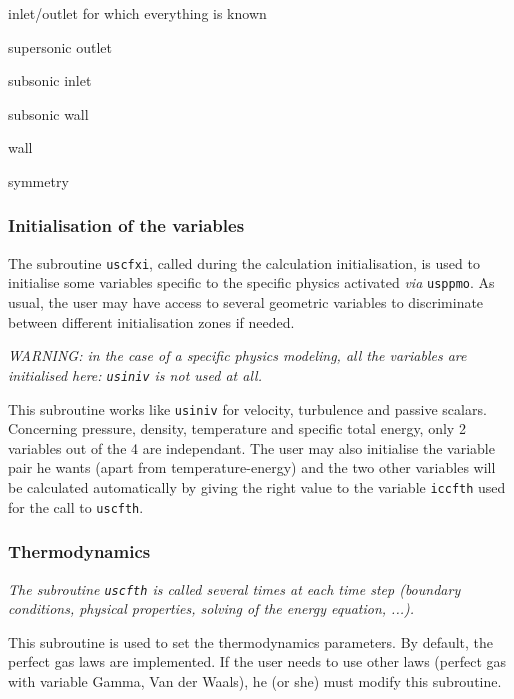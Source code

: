 {{{\begin{list}{-}{}
  \item inlet/outlet for which everything is known
  \item supersonic outlet
  \item subsonic inlet
  \item subsonic wall
  \item wall
  \item symmetry
\end{list}

\subsubsection{Initialisation of the variables}

The subroutine \texttt{uscfxi}, called during the calculation initialisation,
 is used to initialise some variables specific to the
specific physics activated {\em via} \texttt{usppmo}.  As usual,
the user may have access to several geometric variables to discriminate
between different initialisation zones if needed.

{\em WARNING: in the case of a specific physics modeling, all the
variables are initialised here: {\em \texttt{usiniv}} is not used at
all.}

This subroutine works like \texttt{usiniv} for velocity,
turbulence and passive scalars. Concerning pressure, density,
temperature and specific total energy, only 2 variables out of the 4 are
independant. The user may also initialise the variable pair he wants
(apart from temperature-energy) and the two other variables will be
calculated automatically by giving the right value to the variable
\texttt{iccfth} used for the call to \texttt{uscfth}.

\subsubsection{Thermodynamics}

\noindent
\textit{The subroutine \texttt{uscfth} is called several times at each time step
 (boundary conditions, physical properties, solving of the energy equation, ...).}

This subroutine is used to set the thermodynamics parameters. By
default, the perfect gas laws are implemented. If the user needs to use
other laws (perfect gas with variable Gamma, Van der Waals), he (or she) must
modify this subroutine.

}}}
